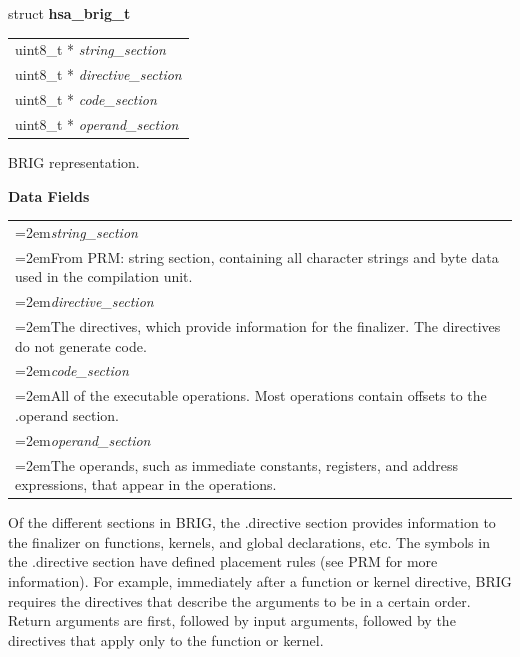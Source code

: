 \documentclass{book}
\newcommand{\hsaarg}[1]{\textit{#1}}
\newcommand{\hsadef}[2]{\hypertarget{#1}{\textbf{#2}}}
\begin{document}
\begin{appendices}
\makeatletter{}

\noindent\begin{tcolorbox}[breakable,nobeforeafter,arc=0mm,colframe=white,colback=lightgray,left=0mm]
struct \hsadef{group__brig_1ga7b70cc1451b34e489b38395023467577}{hsa\_brig\_t}
\vspace{-3.5mm}\begin{longtable}{@{}p{\textwidth}}
\hspace{1.7em}uint8\_t * \hsaarg{string\_section}\\
\hspace{1.7em}uint8\_t * \hsaarg{directive\_section}\\
\hspace{1.7em}uint8\_t * \hsaarg{code\_section}\\
\hspace{1.7em}uint8\_t * \hsaarg{operand\_section}
\end{longtable}

\end{tcolorbox}
BRIG representation.

\noindent\textbf{Data Fields}\\[-5mm]
\begin{longtable}{@{}>{\hangindent=2em}p{\textwidth}}
\hsaarg{string\_section}\\\hspace{2em}From PRM: string section, containing all character strings and byte data used in the compilation unit.\\[2mm]
\hsaarg{directive\_section}\\\hspace{2em}The directives, which provide information for the finalizer. The directives do not generate code.\\[2mm]
\hsaarg{code\_section}\\\hspace{2em}All of the executable operations. Most operations contain offsets to the .operand section.\\[2mm]
\hsaarg{operand\_section}\\\hspace{2em}The operands, such as immediate constants, registers, and address expressions, that appear in the operations.
\end{longtable}

 

Of the different sections in BRIG, the .directive section provides
information to the finalizer on functions, kernels, and global
declarations, etc. The symbols in the .directive section have defined
placement rules (see PRM for more information). For example,
immediately after a function or kernel directive, BRIG requires the
directives that describe the arguments to be in a certain order.
Return arguments are first, followed by input arguments, followed by
the directives that apply only to the function or kernel.


\end{appendices}
\end{document}
